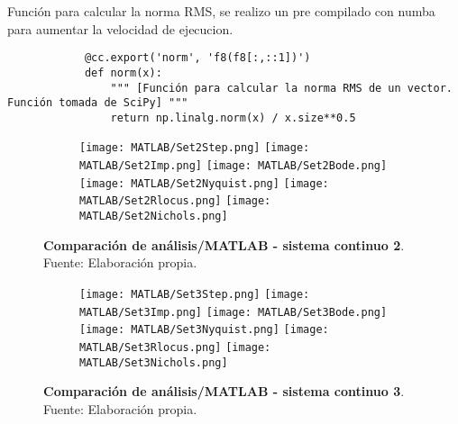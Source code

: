     \begin{longlisting}
        \caption[Función para calcular la norma RMS]{Función para calcular la norma RMS, se realizo un pre compilado con numba para aumentar la velocidad de ejecucion.}
        \label{code:normarms}				
        \begin{verbatim}
            @cc.export('norm', 'f8(f8[:,::1])')
            def norm(x):
                """ [Función para calcular la norma RMS de un vector. Función tomada de SciPy] """
                return np.linalg.norm(x) / x.size**0.5
        \end{verbatim}
    \end{longlisting}

        
    \begin{figure}[!h]
        \centering
        \begin{subfigure}[t]{0.99\textwidth}
            \centering
            \texttt{[image: MATLAB/Set2Step.png]}
            \texttt{[image: MATLAB/Set2Imp.png]}
            \texttt{[image: MATLAB/Set2Bode.png]}
            \texttt{[image: MATLAB/Set2Nyquist.png]}
            \texttt{[image: MATLAB/Set2Rlocus.png]}
            \texttt{[image: MATLAB/Set2Nichols.png]}
            \label{fig:Set2sub}
        \end{subfigure}
        \caption[Comparación de análisis/MATLAB - sistema continuo 2]{\textbf{Comparación de análisis/MATLAB - sistema continuo 2}. Fuente: Elaboración propia. \label{fig:Set2}}
    \end{figure}

    \begin{figure}[htb]
        \centering
        \begin{subfigure}[t]{0.99\textwidth}
            \centering
            \texttt{[image: MATLAB/Set3Step.png]}
            \texttt{[image: MATLAB/Set3Imp.png]}
            \texttt{[image: MATLAB/Set3Bode.png]}
            \texttt{[image: MATLAB/Set3Nyquist.png]}
            \texttt{[image: MATLAB/Set3Rlocus.png]}
            \texttt{[image: MATLAB/Set3Nichols.png]}
            \label{fig:Set3sub}
        \end{subfigure}
        \caption[Comparación de análisis/MATLAB - sistema continuo 3]{\textbf{Comparación de análisis/MATLAB - sistema continuo 3}. Fuente: Elaboración propia. \label{fig:Set3}}
    \end{figure}

